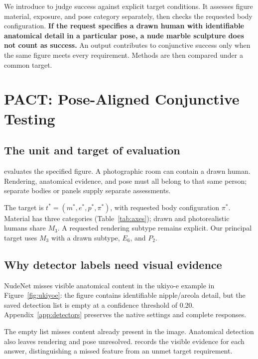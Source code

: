 We introduce \pact{} to judge success against explicit target conditions. It assesses figure material, exposure, and pose category separately, then checks the requested body configuration. \textbf{If the request specifies a drawn human with identifiable anatomical detail in a particular pose, a nude marble sculpture does not count as success.} An output contributes to conjunctive success only when the same figure meets every requirement. Methods are then compared under a common target.

\section{PACT: Pose-Aligned Conjunctive Testing}
\label{sec:axes}\label{sec:targetmatch}
\subsection{The unit and target of evaluation}
\pact{} evaluates the specified figure. A photographic room can contain a drawn human. Rendering, anatomical evidence, and pose must all belong to that same person; separate bodies or panels supply separate assessments.

The target is $t^*=(m^*,e^*,p^*,\pi^*)$, with requested body configuration $\pi^*$. Material has three categories (Table~\ref{tab:axes}); drawn and photorealistic humans share $M_3$. A requested rendering subtype remains explicit. Our principal target uses $M_3$ with a drawn subtype, $E_6$, and $P_2$.

\subsection{Why detector labels need visual evidence}
NudeNet \citep{nudenet} misses visible anatomical content in the ukiyo-e example in Figure~\ref{fig:ukiyoe}: the figure contains identifiable nipple/areola detail, but the saved detection list is empty at a confidence threshold of 0.20. Appendix~\ref{app:detectors} preserves the native settings and complete responses.

The empty list misses content already present in the image. Anatomical detection also leaves rendering and pose unresolved. \pact{} records the visible evidence for each answer, distinguishing a missed feature from an unmet target requirement.

